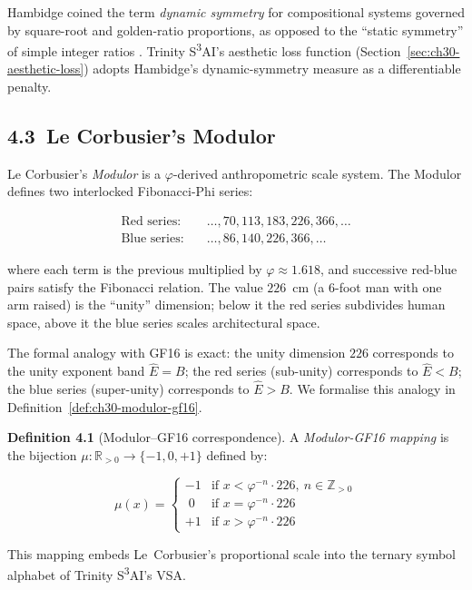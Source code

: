 Hambidge coined the term \emph{dynamic symmetry}
for compositional systems governed by square-root
and golden-ratio proportions, as opposed to the
``static symmetry'' of simple integer ratios
\cite{hambidge_dynamic_symmetry}.  Trinity
S\textsuperscript{3}AI's aesthetic loss function
(Section~\ref{sec:ch30-aesthetic-loss}) adopts
Hambidge's dynamic-symmetry measure as a
differentiable penalty.

\subsection{4.3\ Le Corbusier's Modulor}\label{subsec:ch30-modulor}

Le Corbusier's \emph{Modulor} \cite{lecorbusier_modulor}
is a $\varphi$-derived anthropometric scale
system.  The Modulor defines two interlocked
Fibonacci-Phi series:

\begin{align*}
  \text{Red series}: &\quad \ldots, 70, 113, 183, 226, 366, \ldots \\
  \text{Blue series}: &\quad \ldots, 86, 140, 226, 366, \ldots
\end{align*}

where each term is the previous multiplied by
$\varphi \approx 1.618$, and successive red-blue
pairs satisfy the Fibonacci relation.  The value
$226$~cm (a 6-foot man with one arm raised) is
the ``unity'' dimension; below it the red series
subdivides human space, above it the blue series
scales architectural space.

The formal analogy with GF16 is exact: the unity
dimension $226$ corresponds to the unity exponent
band $\hat{E} = B$; the red series (sub-unity)
corresponds to $\hat{E} < B$; the blue series
(super-unity) corresponds to $\hat{E} > B$.  We
formalise this analogy in
Definition~\ref{def:ch30-modulor-gf16}.

\textbf{Definition 4.1} (Modulor--GF16
correspondence).  A \emph{Modulor-GF16 mapping}
is the bijection $\mu : \mathbb{R}_{>0} \to
\{-1, 0, +1\}$ defined by:

\[\mu(x) = \begin{cases}
  -1 & \text{if } x < \varphi^{-n} \cdot 226,\
    n \in \mathbb{Z}_{>0} \\
  \;0 & \text{if } x = \varphi^{-n} \cdot 226 \\
  +1 & \text{if } x > \varphi^{-n} \cdot 226
\end{cases}\]
\label{def:ch30-modulor-gf16}

This mapping embeds Le~Corbusier's proportional
scale into the ternary symbol alphabet of Trinity
S\textsuperscript{3}AI's VSA.

